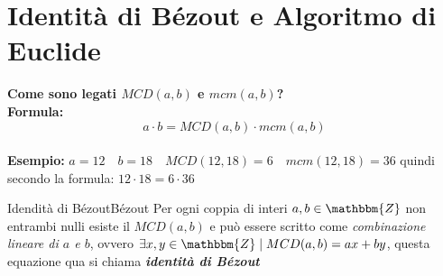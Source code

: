 \documentclass[12pt, letterpaper]{report}
\newcounter{theorem}
\newcommand{\nmu}{}
\begin{document}
		\section{Identità di Bézout e Algoritmo di Euclide}
		\textbf{Come sono legati $MCD(a,b)$ e $mcm(a,b)$?} \\
		\textbf{Formula:} \[a \cdot b = MCD(a, b) \cdot mcm(a,b)\] \\
		\textbf{Esempio:} $a = 12 \quad b = 18 \quad MCD(12,18) = 6 \quad mcm(12,18) = 36$ quindi secondo la formula: $12 \cdot 18 = 6 \cdot 36$
		\begin{theorem}{\nmu Idendità di Bézout}{Bézout}
			Per ogni coppia di interi $a,b \in \mathbbm{Z}$ non entrambi nulli esiste il $MCD(a,b)$ e può essere scritto come \textit{combinazione lineare di $a$ e $b$}, ovvero $\exists x,y \in \mathbbm{Z} \mid MCD(a,b) = ax + by$, questa equazione qua si chiama \textbf{\textit{identità di Bézout}}
		\end{theorem}
\end{document}
